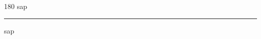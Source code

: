 
\begin{frame}
\begin{center}
\begin{turn}{180}
{\fontsize{2.5cm}{1em}\selectfont sap}
\end{turn}
\vspace{1em}\par  
\hrule
\vspace{1em}\par  
{\fontsize{2.5cm}{1em}\selectfont sap}
\end{center}
\end{frame}
